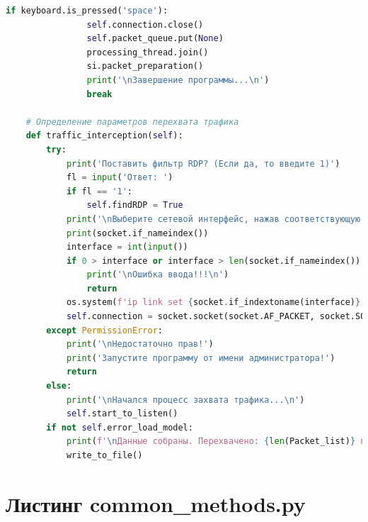 \documentclass[spec, och, diploma]{SCWorks}
\begin{document}
\begin{lstlisting}[language=Python]
            if keyboard.is_pressed('space'):
                self.connection.close()
                self.packet_queue.put(None)
                processing_thread.join()
                si.packet_preparation()
                print('\nЗавершение программы...\n')
                break

    # Определение параметров перехвата трафика
    def traffic_interception(self):
        try:
            print('Поставить фильтр RDP? (Если да, то введите 1)')
            fl = input('Ответ: ')
            if fl == '1':
                self.findRDP = True
            print('\nВыберите сетевой интерфейс, нажав соответствующую цифру:')
            print(socket.if_nameindex())
            interface = int(input())
            if 0 > interface or interface > len(socket.if_nameindex()):
                print('\nОшибка ввода!!!\n')
                return
            os.system(f'ip link set {socket.if_indextoname(interface)} promisc on')
            self.connection = socket.socket(socket.AF_PACKET, socket.SOCK_RAW, socket.ntohs(3))
        except PermissionError:
            print('\nНедостаточно прав!')
            print('Запустите программу от имени администратора!')
            return
        else:
            print('\nНачался процесс захвата трафика...\n')
            self.start_to_listen()
        if not self.error_load_model:
            print(f'\nДанные собраны. Перехвачено: {len(Packet_list)} пакетов(-а)\n')
            write_to_file()
    \end{lstlisting}

    \section{Листинг common\_methods.py}
    
\end{document}
